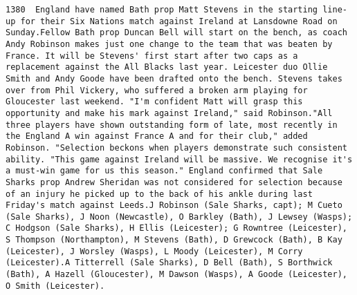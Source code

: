 \documentclass[11pt]{article}
\begin{document}
\begin{Verbatim}[commandchars=\\\{\}]
         1380  England have named Bath prop Matt Stevens in the starting line-up for their Six Nations match against Ireland at Lansdowne Road on Sunday.Fellow Bath prop Duncan Bell will start on the bench, as coach Andy Robinson makes just one change to the team that was beaten by France. It will be Stevens' first start after two caps as a replacement against the All Blacks last year. Leicester duo Ollie Smith and Andy Goode have been drafted onto the bench. Stevens takes over from Phil Vickery, who suffered a broken arm playing for Gloucester last weekend. "I'm confident Matt will grasp this opportunity and make his mark against Ireland," said Robinson."All three players have shown outstanding form of late, most recently in the England A win against France A and for their club," added Robinson. "Selection beckons when players demonstrate such consistent ability. "This game against Ireland will be massive. We recognise it's a must-win game for us this season." England confirmed that Sale Sharks prop Andrew Sheridan was not considered for selection because of an injury he picked up to the back of his ankle during last Friday's match against Leeds.J Robinson (Sale Sharks, capt); M Cueto (Sale Sharks), J Noon (Newcastle), O Barkley (Bath), J Lewsey (Wasps); C Hodgson (Sale Sharks), H Ellis (Leicester); G Rowntree (Leicester), S Thompson (Northampton), M Stevens (Bath), D Grewcock (Bath), B Kay (Leicester), J Worsley (Wasps), L Moody (Leicester), M Corry (Leicester).A Titterrell (Sale Sharks), D Bell (Bath), S Borthwick (Bath), A Hazell (Gloucester), M Dawson (Wasps), A Goode (Leicester), O Smith (Leicester).                                                                                                                                                                                                                                                                                                                                                                                                                                                                                                                                                                                                                                                                                                                                                                                                                                                                                                                                                                                                                                                                                                                                                                                                                                                                                                                                                                                                                                                                                                                                                                                                                                                                                                                                 
\end{Verbatim}
\end{document}
